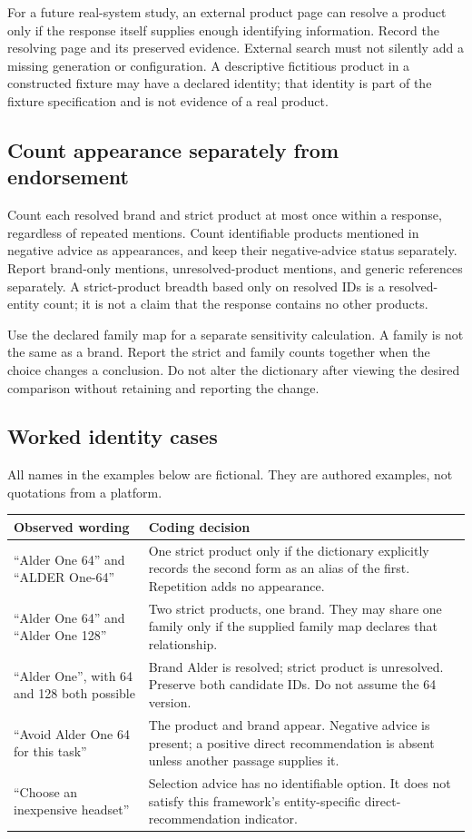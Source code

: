 \documentclass[10pt,a4paper]{article}
\begin{document}
For a future real-system study, an external product page can resolve a product only if the response itself supplies enough identifying information. Record the resolving page and its preserved evidence. External search must not silently add a missing generation or configuration. A descriptive fictitious product in a constructed fixture may have a declared identity; that identity is part of the fixture specification and is not evidence of a real product.

\subsection{Count appearance separately from endorsement}
Count each resolved brand and strict product at most once within a response, regardless of repeated mentions. Count identifiable products mentioned in negative advice as appearances, and keep their negative-advice status separately. Report brand-only mentions, unresolved-product mentions, and generic references separately. A strict-product breadth based only on resolved IDs is a resolved-entity count; it is not a claim that the response contains no other products.

Use the declared family map for a separate sensitivity calculation. A family is not the same as a brand. Report the strict and family counts together when the choice changes a conclusion. Do not alter the dictionary after viewing the desired comparison without retaining and reporting the change.

\subsection{Worked identity cases}
All names in the examples below are fictional. They are authored examples, not quotations from a platform.

\begin{tabularx}{\textwidth}{L{4.4cm}Y}
\toprule Observed wording & Coding decision \\
\midrule
``Alder One 64'' and ``ALDER One-64'' & One strict product only if the dictionary explicitly records the second form as an alias of the first. Repetition adds no appearance. \\
``Alder One 64'' and ``Alder One 128'' & Two strict products, one brand. They may share one family only if the supplied family map declares that relationship. \\
``Alder One'', with 64 and 128 both possible & Brand Alder is resolved; strict product is unresolved. Preserve both candidate IDs. Do not assume the 64 version. \\
``Avoid Alder One 64 for this task'' & The product and brand appear. Negative advice is present; a positive direct recommendation is absent unless another passage supplies it. \\
``Choose an inexpensive headset'' & Selection advice has no identifiable option. It does not satisfy this framework's entity-specific direct-recommendation indicator. \\
\bottomrule
\end{tabularx}
\end{document}
